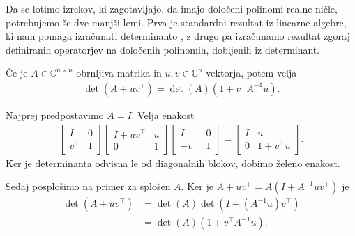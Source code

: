 Da se lotimo izrekov, ki zagotavljajo, da imajo določeni polinomi realne ničle, potrebujemo še dve manjši lemi. Prva je standardni rezultat iz linearne algebre, ki nam pomaga izračunati determinanto \cite{matrix-determinant-lemma}, z drugo pa izračunamo rezultat zgoraj definiranih operatorjev na določenih polinomih, dobljenih iz determinant.
\begin{lema}\label{matrix-det-lemma}
    Če je \(A\in \mathbb C^{n\times n}\) obrnljiva matrika in \(u, v \in \mathbb C^n\) vektorja, potem velja
    \begin{align*}
        \det(A + uv^\top) = \det(A) (1 + v^\top A^{-1} u).
    \end{align*}
\end{lema}
\begin{dokaz}
    Najprej predpostavimo \(A=I\). Velja enakost
    \begin{align*}
        \begin{bmatrix}
            I      & 0 \\
            v^\top & 1
        \end{bmatrix}
        \begin{bmatrix}
            I + uv^\top & u \\
            0           & 1
        \end{bmatrix}
        \begin{bmatrix}
            I       & 0 \\
            -v^\top & 1
        \end{bmatrix}
        =
        \begin{bmatrix}
            I & u            \\
            0 & 1 + v^\top u
        \end{bmatrix}.
    \end{align*}
    Ker je determinanta odvisna le od diagonalnih blokov, dobimo želeno enakost.

    Sedaj posplošimo na primer za splošen \(A\). Ker je \(A+uv^\top= A(I + A^{-1}uv^\top)\) je
    \begin{align*}
        \det(A + uv^\top) & = \det(A) \det(I + (A^{-1}u)v^\top) \\
                          & = \det(A) (1 + v^\top A^{-1} u).
    \end{align*}
\end{dokaz}

